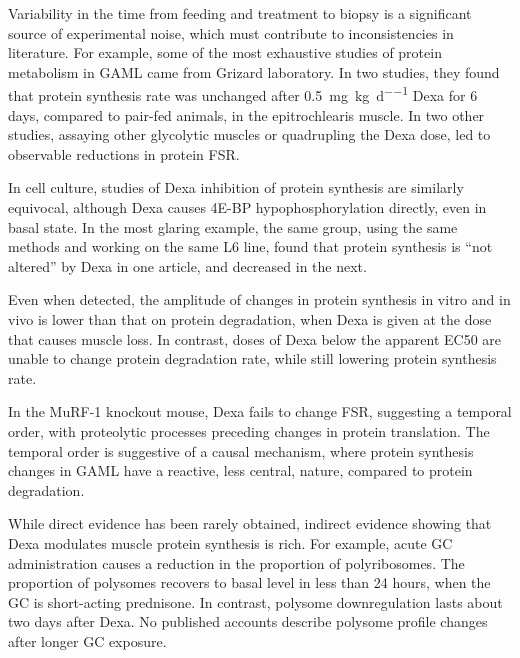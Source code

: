 \documentclass[12pt,english]{report}\usepackage[]{graphicx}\usepackage[]{color}
\begin{document}
Variability in the time from feeding and treatment to biopsy is a
significant source of experimental noise, which must contribute to
inconsistencies in literature. For example, some of the most exhaustive
studies of protein metabolism in GAML came from Grizard laboratory.
In two studies, they found that protein synthesis rate was unchanged
after \SI{0.5}{\milli\gram\per\kilo\gram\per\day} Dexa for 6 days,
compared to pair-fed animals, in the epitrochlearis muscle\citep{dardevet1995sensitivity,rieu2004glucocorticoid}.
In two other studies, assaying other glycolytic muscles or quadrupling
the Dexa dose, led to observable reductions in protein FSR\citep{savary1998effect,dardevet1999glucocorticoid-induced}.

In cell culture, studies of Dexa inhibition of protein synthesis are
similarly equivocal, although Dexa causes 4E-BP hypophosphorylation
directly, even in basal state\citep{shah2000glucocorticoidsa}. In
the most glaring example, the same group, using the same methods and
working on the same L6 line, found that protein synthesis is ``not
altered'' by Dexa in one article, and decreased in the next\citep{menconi2008dexamethasone,aversa2012beta-hydroxy-beta-methylbutyrate}.

Even when detected, the amplitude of changes in protein synthesis
in vitro\citep{aversa2012beta-hydroxy-beta-methylbutyrate,desler1996effects,jones2005vitro}
and in vivo\citep{dardevet1998glucocorticoid} is lower than that
on protein degradation, when Dexa is given at the dose that causes
muscle loss. In contrast, doses of Dexa below the apparent EC50 are
unable to change protein degradation rate, while  still lowering protein
synthesis rate\citep{tomas1992insulin-like}.

In the MuRF-1 knockout mouse, Dexa fails to change FSR\citep{baehr2011muscle},
suggesting a temporal order, with proteolytic processes preceding
changes in protein translation. The temporal order is suggestive of
a causal mechanism, where protein synthesis changes in GAML have a
reactive, less central, nature, compared to protein degradation.

While direct evidence has been rarely obtained, indirect evidence
showing that Dexa modulates muscle protein synthesis is rich. For
example, acute GC administration causes a reduction in the proportion
of polyribosomes\citep{young1968sedimentation}. The proportion of
polysomes recovers to basal level in less than 24 hours, when the
GC is short-acting prednisone\citep{bullock1972relative}. In contrast,
polysome downregulation lasts about two days after Dexa. No published
accounts describe polysome profile changes after longer GC exposure.
\end{document}
